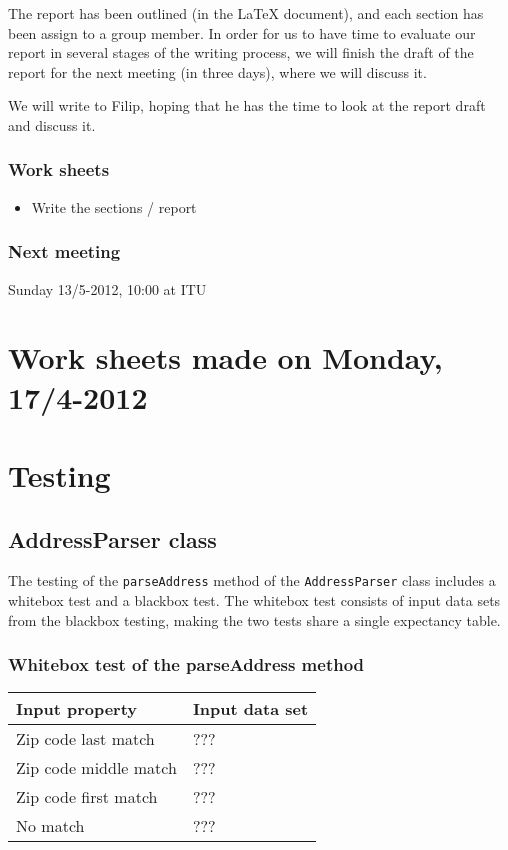 \documentclass[a4paper,11pt]{article}
\begin{document}
The report has been outlined (in the LaTeX document), and each section has been assign to a group member. In order for us to have time to evaluate our report in several stages of the writing process, we will finish the draft of the report for the next meeting (in three days), where we will discuss it.

We will write to Filip, hoping that he has the time to look at the report draft and discuss it.

\subsubsection*{Work sheets}
\begin{itemize}
	\item Write the sections / report
\end{itemize}

\subsubsection*{Next meeting}
Sunday 13/5-2012, 10:00 at ITU

\pagebreak
\section{Work sheets made on Monday, 17/4-2012}


\pagebreak
\section{Testing}

\subsection{AddressParser class}
The testing of the \texttt{parseAddress} method of the \texttt{AddressParser} class includes a whitebox test and a blackbox test. The whitebox test consists of input data sets from the blackbox testing, making the two tests share a single expectancy table.

\subsubsection{Whitebox test of the parseAddress method}
\begin{tabular}{ p{7cm} | p{4cm}}
	\textbf{Input property} & \textbf{Input data set} \\
	\hline
	Zip code last match & ??? \\
	Zip code middle match & ??? \\
	Zip code first match & ??? \\
	No match & ???
\end{tabular}
\end{document}
